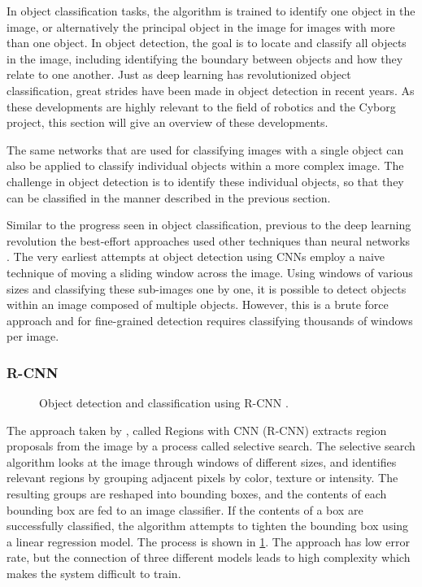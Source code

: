 \documentclass[\rootfolder/main.tex]{subfiles}
\begin{document}
In object classification tasks, the algorithm is trained to identify one object in the image, or alternatively the principal object in the image for images with more than one object.
In object detection, the goal is to locate and classify all objects in the image, including identifying the boundary between objects and how they relate to one another.
Just as deep learning has revolutionized object classification, great strides have been made in object detection in recent years.
As these developments are highly relevant to the field of robotics and the Cyborg project, this section will give an overview of these developments.

The same networks that are used for classifying images with a single object can also be applied to classify individual objects within a more complex image.
The challenge in object detection is to identify these individual objects, so that they can be classified in the manner described in the previous section.

Similar to the progress seen in object classification, previous to the deep learning revolution the best-effort approaches used other techniques than neural networks \cite{Girshick2013}.
The very earliest attempts at object detection using CNNs employ a naive technique of moving a sliding window across the image.
Using windows of various sizes and classifying these sub-images one by one, it is possible to detect objects within an image composed of multiple objects.
However, this is a brute force approach and for fine-grained detection requires classifying thousands of windows per image.

\subsubsection{R-CNN}

\begin{figure}
    \caption{Object detection and classification using R-CNN \cite{Girshick2013}.\label{fig:r-cnn}}
\end{figure}

The approach taken by \cite{Girshick2013}, called Regions with CNN (R-CNN) extracts region proposals from the image by a process called selective search.
The selective search algorithm looks at the image through windows of different sizes, and identifies relevant regions by grouping adjacent pixels by color, texture or intensity.
The resulting groups are reshaped into bounding boxes, and the contents of each bounding box are fed to an image classifier.
If the contents of a box are successfully classified, the algorithm attempts to tighten the bounding box using a linear regression model.
The process is shown in \cref{fig:r-cnn}.
The approach has low error rate, but the connection of three different models leads to high complexity which makes the system difficult to train.
\end{document}
